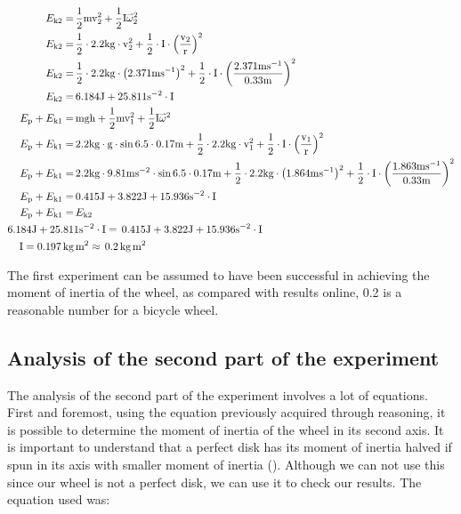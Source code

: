 \documentclass{article}
\newcommand{\myvect}[1]{\accentset{\rightharpoonup}{#1}}
\begin{document}
\begin{equation*}
\begin{split}
\begin{aligned}
E_{\text{k}2} =&\, \frac{1}{2}\text{mv}^{2}_2+\frac{1}{2}\text{I}\myvect{\omega}^{2}_2\\
E_{\text{k}2} =&\, \frac{1}{2}\cdot2.2\text{kg}\cdot{\text{v}}_2^{2}+\frac{1}{2}\cdot\text{I}\cdot\left(\frac{\text{v}_2}{\text{r}}\right)^{2}\\
E_{\text{k}2} =&\, \frac{1}{2}\cdot2.2\text{kg}\cdot{\left(2.371\text{ms}^{-1}\right)}^{2}+\frac{1}{2}\cdot\text{I}\cdot\left(\frac{2.371\text{ms}^{-1}}{0.33\text{m}}\right)^{2}\\
E_{\text{k}2} =&\, 6.184\text{J}+25.811\text{s}^{-2}\cdot\text{I}\\
E_{\text{p}} + E_{\text{k}1} =&\, \text{mgh} + \frac{1}{2}\text{mv}^{2}_1+\frac{1}{2}\text{I}\myvect{\omega}^{2} \\
E_{\text{p}} + E_{\text{k}1} =&\, 2.2\text{kg}\cdot\text{g}\cdot\sin{6.5}\cdot0.17\text{m} +\frac{1}{2}\cdot2.2\text{kg}\cdot\text{v}^{2}_1+\frac{1}{2}\cdot\text{I}\cdot\left(\frac{\text{v}_1}{\text{r}}\right)^{2} \\
E_{\text{p}} + E_{\text{k}1} =&\, 2.2\text{kg}\cdot9.81\text{ms}^{-2}\cdot\sin{6.5}\cdot0.17\text{m} +\frac{1}{2}\cdot2.2\text{kg}\cdot{\left(1.864\text{ms}^{-1}\right)}^{2}+\frac{1}{2}\cdot\text{I}\cdot\left(\frac{1.863\text{ms}^{-1}}{0.33\text{m}}\right)^{2} \\
E_{\text{p}} + E_{\text{k}1} =&\, 0.415\text{J}+3.822\text{J}+15.936\text{s}^{-2}\cdot\text{I} \\
E_{\text{p}} + E_{\text{k}1} =&\, E_{\text{k}2}\\
6.184\text{J}+25.81&1\text{s}^{-2}\cdot\text{I} =\, 0.415\text{J}+3.822\text{J}+15.936\text{s}^{-2}\cdot\text{I}\\
\text{I} = 0.197\,\text{kg}&\,\text{m}^2\approx\, 0.2\,\text{kg}\,\text{m}^2
\end{aligned}
\end{split}
\end{equation*}

The first experiment can be assumed to have been successful in achieving the moment of inertia of the wheel, as compared with results online, 0.2 is a reasonable number for a bicycle wheel. 

\subsection{Analysis of the second part of the experiment}
The analysis of the second part of the experiment involves a lot of equations. First and foremost, using the equation previously acquired through reasoning, it is possible to determine the moment of inertia of the wheel in its second axis. It is important to understand that a perfect disk has its moment of inertia halved if spun in its axis with smaller moment of inertia (\cite{listofmomentofinertia}). Although we can not use this since our wheel is not a perfect disk, we can use it to check our results. The equation used was:
\end{document}
